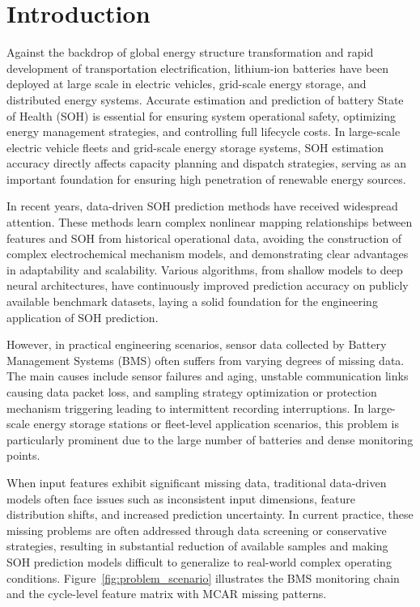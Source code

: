 \documentclass[5p,times]{elsarticle}
\begin{document}
\section{Introduction}\label{sec:intro}

Against the backdrop of global energy structure transformation and rapid development of transportation electrification, lithium-ion batteries have been deployed at large scale in electric vehicles, grid-scale energy storage, and distributed energy systems. Accurate estimation and prediction of battery State of Health (SOH) is essential for ensuring system operational safety, optimizing energy management strategies, and controlling full lifecycle costs. In large-scale electric vehicle fleets and grid-scale energy storage systems, SOH estimation accuracy directly affects capacity planning and dispatch strategies, serving as an important foundation for ensuring high penetration of renewable energy sources.

In recent years, data-driven SOH prediction methods have received widespread attention\cite{luo2022review}. These methods learn complex nonlinear mapping relationships between features and SOH from historical operational data, avoiding the construction of complex electrochemical mechanism models, and demonstrating clear advantages in adaptability and scalability. Various algorithms, from shallow models to deep neural architectures\cite{liu2025deep,shao2023review,wang2023battery}, have continuously improved prediction accuracy on publicly available benchmark datasets, laying a solid foundation for the engineering application of SOH prediction.

However, in practical engineering scenarios, sensor data collected by Battery Management Systems (BMS) often suffers from varying degrees of missing data. The main causes include sensor failures and aging, unstable communication links causing data packet loss, and sampling strategy optimization or protection mechanism triggering leading to intermittent recording interruptions. In large-scale energy storage stations or fleet-level application scenarios, this problem is particularly prominent due to the large number of batteries and dense monitoring points.

When input features exhibit significant missing data, traditional data-driven models often face issues such as inconsistent input dimensions, feature distribution shifts, and increased prediction uncertainty. In current practice, these missing problems are often addressed through data screening or conservative strategies, resulting in substantial reduction of available samples and making SOH prediction models difficult to generalize to real-world complex operating conditions. Figure~\ref{fig:problem_scenario} illustrates the BMS monitoring chain and the cycle-level feature matrix with MCAR missing patterns.
\end{document}

